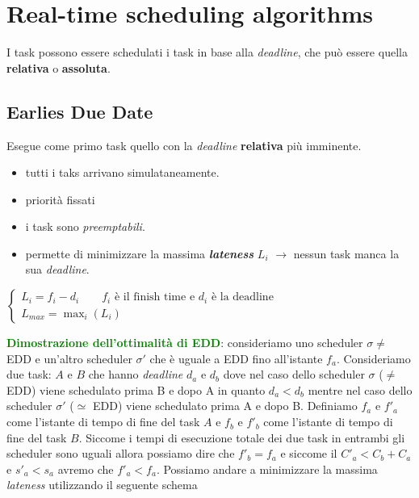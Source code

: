 \chapter{Real-time scheduling algorithms}
I task possono essere schedulati i task in base alla \textit{deadline}, che può essere quella \textbf{relativa} o \textbf{assoluta}.

\section{Earlies Due Date}
Esegue come primo task quello con la \textit{deadline} \textbf{relativa} più imminente.
\begin{itemize}
    \item tutti i taks arrivano simulataneamente.
    \item priorità fissati\item i task sono \textit{preemptabili}.
    \item permette di minimizzare la massima \textbf{\textit{lateness}} $L_i$ $\rightarrow$ nessun task manca la sua \textit{deadline}.
\end{itemize}
\begin{center}
    \begin{math}
        \begin{cases}
            L_i = f_i - d_i \qquad f_i \text{ è il finish time e } d_i \text{ è la deadline} \\
            L_{max} = \max_i(L_i)
        \end{cases}
    \end{math}
\end{center}
\textcolor{green}{\textbf{Dimostrazione dell'ottimalità di EDD}}: consideriamo uno scheduler $\sigma \neq$ EDD e un'altro scheduler $\sigma'$ che è uguale a EDD fino all'istante $f_a$.
Consideriamo due task: $A$ e $B$ che hanno \textit{deadline} $d_a$ e $d_b$ dove nel caso dello scheduler $\sigma$ ($\neq$ EDD) viene schedulato prima B e dopo A in quanto $d_a < d_b$ mentre nel caso dello scheduler $\sigma'$ ($\simeq$ EDD) viene schedulato prima A e dopo B. Definiamo $f_a$ e $f'_a$ come l'istante di tempo di fine del task $A$ e $f_b$ e $f'_b$ come l'istante di tempo di fine del task $B$. Siccome i tempi di esecuzione totale dei due task in entrambi gli scheduler sono uguali allora possiamo dire che $f'_b = f_a$ e siccome il $C'_a < C_b + C_a$ e $s'_a < s_a$ avremo che $f'_a < f_a$. Possiamo andare a minimizzare la massima \textit{lateness} utilizzando il seguente schema
